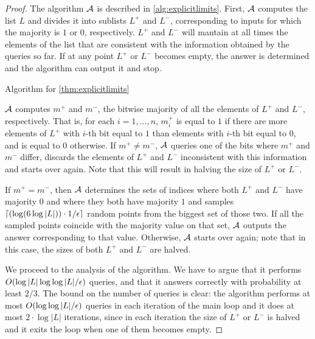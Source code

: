 \begin{proof}

The algorithm $\mathcal{A}$ is described in \cref{alg:explicitlimits}. First, $\mathcal{A}$ computes the list $L$ and divides it into
sublists $L^+$ and $L^-$, corresponding to inputs for which the majority is $1$ or $0$, respectively. $L^+$ and $L^-$ will mantain at all times the elements
of the list that are consistent with the information obtained by the queries so far. If at any point
$L^+$ or $L^-$ becomes empty, the answer is determined and the algorithm can output it and stop. 

\begin{algorithm}
\caption{Algorithm for \cref{thm:explicitlimits}}\label{alg:explicitlimits}
\begin{algorithmic}

\end{algorithmic}
\end{algorithm}
    

$\mathcal{A}$ computes $m^+$ and $m^-$, the bitwise majority of all the elements of $L^+$ and $L^-$, respectively.
That is, for each $i = 1, \ldots, n$, $m^+_i$ is equal to $1$ if there are more elements of $L^+$ with $i$-th bit
equal to $1$ than elements with $i$-th bit equal to $0$, and is equal to $0$ otherwise. If $m^+ \neq m^-$, $\mathcal{A}$
queries one of the bits where $m^+$ and $m^-$ differ, discards the elements of $L^+$ and $L^-$ inconsistent with 
this information and starts over again. Note that this will result in halving the size of $L^+$ or $L^-$. 

If $m^+ = m^-$, then $\mathcal{A}$ determines the sets of indices where both $L^+$ and $L^-$ have majority $0$ 
and where they both have majority $1$ and samples $\lceil (\log (6 \log |L|)) \cdot 1/\epsilon \rceil$ random points
from the biggest set of those two. If all the sampled points coincide with the majority value on that 
set, $\mathcal{A}$ outputs the answer corresponding to that value. Otherwise, $\mathcal{A}$ starts over again; note that in
this case, the sizes of both $L^+$ and $L^-$ are halved.  

We proceed to the analysis of the algorithm. We have to argue that it performs $O(\log |L| \log \log |L| / \epsilon)$ queries, and
that it answers correctly with probability at least $2/3$. The bound on the number of queries is clear: 
the algorithm performs at most $O(\log \log |L| /\epsilon)$ queries in each iteration of the main loop
and it does at most $2 \cdot \log |L|$ iterations, since in each iteration the size 
of $L^+$ or $L^-$ is halved and it exits the loop when one of them becomes empty.


\end{proof}
